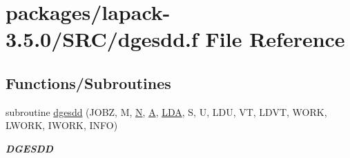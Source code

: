 \hypertarget{dgesdd_8f}{}\section{packages/lapack-\/3.5.0/\+S\+R\+C/dgesdd.f File Reference}
\label{dgesdd_8f}
\subsection*{Functions/\+Subroutines}
\begin{DoxyCompactItemize}
\item 
subroutine \hyperlink{group__doubleGEsing_gad8e0f1c83a78d3d4858eaaa88a1c5ab1}{dgesdd} (J\+O\+B\+Z, M, \hyperlink{polmisc_8c_a0240ac851181b84ac374872dc5434ee4}{N}, \hyperlink{classA}{A}, \hyperlink{example__user_8c_ae946da542ce0db94dced19b2ecefd1aa}{L\+D\+A}, S, U, L\+D\+U, V\+T, L\+D\+V\+T, W\+O\+R\+K, L\+W\+O\+R\+K, I\+W\+O\+R\+K, I\+N\+F\+O)
\begin{DoxyCompactList}\small\item\em {\bfseries D\+G\+E\+S\+D\+D} \end{DoxyCompactList}\end{DoxyCompactItemize}
